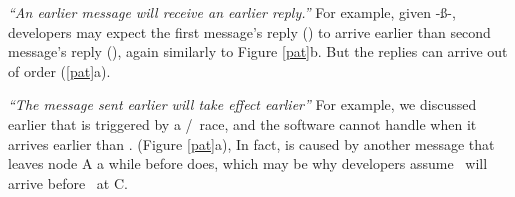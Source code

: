 \item {\it ``An earlier message will receive an earlier reply.''}  For
example, given \mcb-\mbc\ss\mca-\mac, developers may expect the first
message's reply (\mbc) to arrive earlier than second message's reply
(\mac), again similarly to Figure \ref{pat}b.  But the replies can
arrive out of order (\ref{pat}a).  

\item {\it ``The message sent earlier will take effect earlier''} For
example, we discussed earlier that  is triggered by a
\mbc/\mac\ race, and the software cannot handle \mac{} when it
arrives earlier than \mbc{}.  (Figure \ref{pat}a), In
fact, \mbc{} is caused by another message \mab{} that
leaves node A a while before \mac{} does, which may be
why developers assume \mbc\ will arrive before \mac\ at C.
%
\fi






